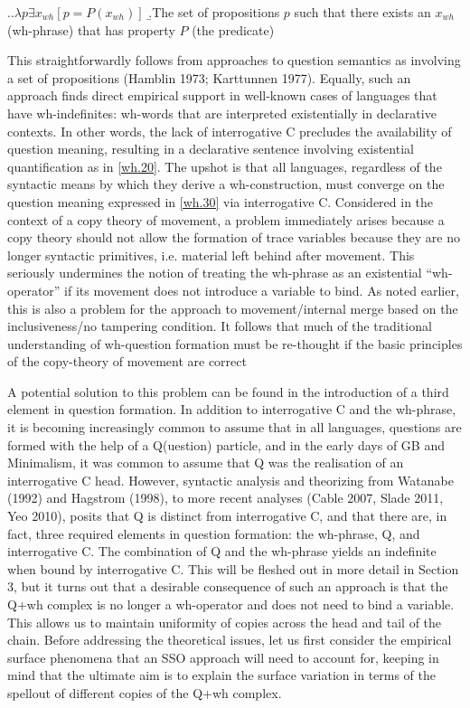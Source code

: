 \documentclass{glossa}
\begin{document}
\ex.\label{wh.30}\a.$\lambda p\exists x_{wh}[p = P(x_{wh})]$
   \b.The set of propositions $p$ such that there exists an $x_{wh}$ (wh-phrase) that has property $P$ (the predicate)

This straightforwardly follows from approaches to question semantics as involving a set of propositions (Hamblin 1973; Karttunnen 1977).  Equally, such an approach finds direct empirical support in well-known cases of languages that have wh-indefinites: wh-words that are interpreted existentially in declarative contexts. In other words, the lack of interrogative C precludes the availability of question meaning, resulting in a declarative sentence involving existential quantification as in \ref{wh.20}. The upshot is that all languages, regardless of the syntactic means by which they derive a wh-construction, must converge on the question meaning expressed in \ref{wh.30} via interrogative C. Considered in the context of a copy theory of movement, a problem immediately arises because a copy theory should not allow the formation of trace variables because they are no longer syntactic primitives, i.e. material left behind after movement. This seriously undermines the notion of treating the wh-phrase as an existential ``wh-operator'' if its movement does not introduce a variable to bind.  As noted earlier, this is also a problem for the approach to movement/internal merge based on the inclusiveness/no tampering condition.  It follows that much of the traditional understanding of wh-question formation must be re-thought if the basic principles of the copy-theory of movement are correct

A potential solution to this problem can be found in the introduction of a third element in question formation. In addition to interrogative C and the wh-phrase, it is becoming increasingly common to assume that in all languages, questions are formed with the help of a Q(uestion) particle, and in the early days of GB and Minimalism, it was common to assume that Q was the realisation of an interrogative C head. However, syntactic analysis and theorizing from Watanabe (1992) and Hagstrom (1998), to more recent analyses (Cable 2007, Slade 2011, Yeo 2010), posits that Q is distinct from interrogative C, and that there are, in fact, three required elements in question formation: the wh-phrase, Q, and interrogative C. The combination of Q and the wh-phrase yields an indefinite when bound by interrogative C. This will be fleshed out in more detail in Section 3, but it turns out that a desirable consequence of such an approach is that the Q+wh complex is no longer a wh-operator and does not need to bind a variable. This allows us to maintain uniformity of copies across the head and tail of the chain. Before addressing the theoretical issues, let us first consider the empirical surface phenomena that an SSO approach will need to account for, keeping in mind that the ultimate aim is to explain the surface variation in terms of the spellout of different copies of the Q+wh complex.
\end{document}
